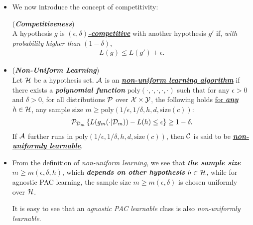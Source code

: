\documentclass[11pt]{article}
\begin{document}
\begin{itemize}
\item We now introduce the concept of competitivity:
\begin{definition} (\emph{\textbf{Competitiveness}}) \\
A hypothesis $g$ is \underline{\emph{\textbf{$(\epsilon, \delta)$-competitive}}} with another hypothesis $g'$ if, \emph{with probability higher than} $(1 - \delta)$,
\begin{align*}
L(g) \le L(g') + \epsilon.
\end{align*}
\end{definition}

\item  \begin{definition} (\emph{\textbf{Non-Uniform Learning}})\\
Let ${\mathcal H}$ be a hypothesis set. ${\mathcal A}$ is an \underline{\emph{\textbf{non-uniform learning algorithm}}} if there
exists a \emph{\textbf{polynomial function}} $\text{poly}(\cdot, \cdot, \cdot, \cdot, \cdot)$  such that for any $\epsilon > 0$ and $\delta > 0$,
for all distributions ${\mathcal P}$ over ${\mathcal X} \times {\mathcal Y}$, the following holds \underline{for \textbf{\emph{any}} $h \in {\mathcal H}$}, any sample size $m \ge \text{poly}(1/\epsilon, 1/\delta, h, d, \text{size}(c))$:
\begin{align}
{\mathcal P}_{{\mathcal D}_m}\left\{L(g_m(\cdot| {\mathcal D}_{m})) - L(h)  \le \epsilon \right\} \ge 1 - \delta. \label{eqn: agnostic_pac_definition}
\end{align} If ${\mathcal A}$ further runs in $\text{poly}(1/\epsilon, 1/\delta, h, d, \text{size}(c))$, then ${\mathcal C}$ is said to be \emph{\textbf{\underline{non-uniformly learnable}}}. 
\end{definition}

\item \begin{remark}
From the definition of \emph{non-uniform learning}, we see that \emph{\textbf{the sample size}} $m \ge m(\epsilon, \delta, h)$, which \emph{\textbf{depends on other hypothesis}} $h \in {\mathcal H}$, while for agnostic PAC learning, the sample size $m \ge m(\epsilon, \delta)$ is chosen uniformly over ${\mathcal H}$. 

It is easy to see that an \emph{agnostic PAC learnable} class is also \emph{non-uniformly learnable}.
\end{remark}
\end{itemize}
\end{document}
